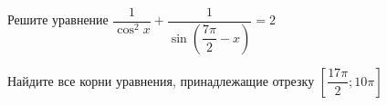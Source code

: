 \begin{ex}
	\begin{condition}
		\begin{enumcols}[label=\asbuk*)]
			\item Решите уравнение \( \dfrac{1}{\cos^2 x} + \dfrac{1}{\sin{\left(\dfrac{7\pi}{2} - x\right)}} = 2\)
			\item Найдите все корни уравнения, принадлежащие отрезку \( \left[\dfrac{17\pi}{2};10\pi\right] \)
		\end{enumcols}
	\end{condition}
\end{ex}